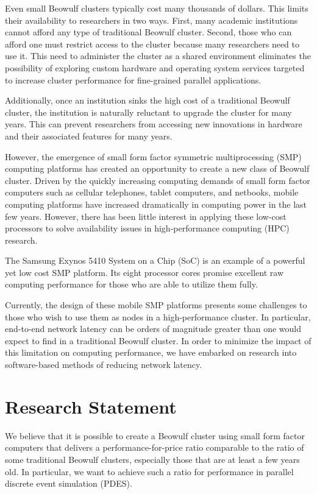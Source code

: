 \documentclass[11pt]{book}
\begin{document}
Even small Beowulf clusters typically cost many thousands of dollars. This
limits their availability to researchers in two ways. First, many academic
institutions cannot afford any type of traditional Beowulf cluster. Second,
those who can afford one must restrict access to the cluster because many
researchers need to use it. This need to administer the cluster as a shared
environment eliminates the possibility of exploring custom hardware and
operating system services targeted to increase cluster performance for
fine-grained parallel applications.

Additionally, once an institution sinks the high cost of a traditional Beowulf
cluster, the institution is naturally reluctant to upgrade the cluster for many
years. This can prevent researchers from accessing new innovations in hardware
and their associated features for many years.

However, the emergence of small form factor symmetric multiprocessing (SMP)
computing platforms has created an opportunity to create a new class of Beowulf
cluster. Driven by the quickly increasing computing demands of small form factor
computers such as cellular telephones, tablet computers, and netbooks, mobile
computing platforms have increased dramatically in computing power in the last
few years. However, there has been little interest in applying these low-cost
processors to solve availability issues in high-performance computing (HPC)
research.

The Samsung Exynos 5410 System on a Chip (SoC) is an example of a powerful yet
low cost SMP platform. Its eight processor cores promise excellent raw computing
performance for those who are able to utilize them fully.

Currently, the design of these mobile SMP platforms presents some challenges to
those who wish to use them as nodes in a high-performance cluster. In
particular, end-to-end network latency can be orders of magnitude greater than
one would expect to find in a traditional Beowulf cluster. In order to minimize
the impact of this limitation on computing performance, we have embarked on
research into software-based methods of reducing network latency.

\section{\textbf{Research Statement}}

We believe that it is possible to create a Beowulf cluster using small form
factor computers that delivers a performance-for-price ratio comparable to the
ratio of some traditional Beowulf clusters, especially those that are at least a few
years old. In particular, we want to achieve such a ratio for performance in
parallel discrete event simulation (PDES).
\end{document}
